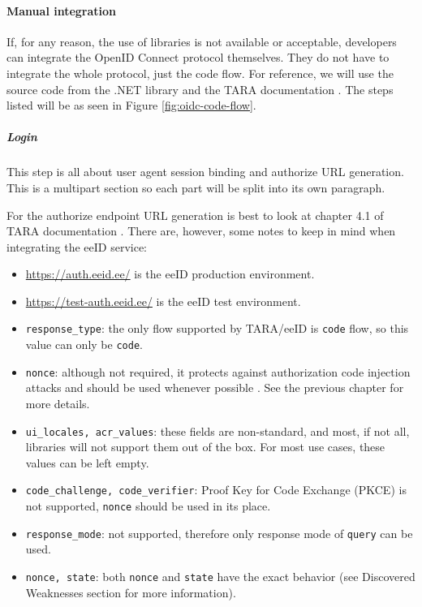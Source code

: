 \paragraph{Manual integration} If, for any reason, the use of libraries is not available or acceptable, developers can integrate the OpenID Connect protocol themselves. They do not have to integrate the whole protocol, just the code flow. For reference, we will use the source code from the {.NET} library \cite{ms-auth-oidc-src} and the TARA documentation \cite{tara-technical}. The steps listed will be as seen in Figure \ref{fig:oidc-code-flow}.

\subparagraph{Login}

This step is all about user agent session binding and {authorize URL} generation. This is a multipart section so each part will be split into its own paragraph.

For the {authorize} endpoint URL generation is best to look at chapter 4.1 of TARA documentation \cite{tara-technical}. There are, however, some notes to keep in mind when integrating the eeID service:

\begin{itemize}
  \item \url{https://auth.eeid.ee/} is the eeID production environment.
  \item \url{https://test-auth.eeid.ee/} is the eeID test environment.
  \item \texttt{response\_type}: the only flow supported by TARA/eeID is \texttt{code} flow, so this value can only be \texttt{code}.
  \item \texttt{nonce}: although not required, it protects against authorization code injection attacks and should be used whenever possible \cite{ietf-oauth-security-topics-19}. See the previous chapter for more details.
  \item \texttt{ui\_locales, acr\_values}: these fields are non-standard, and most, if not all, libraries will not support them out of the box. For most use cases, these values can be left empty.
  \item \texttt{code\_challenge, code\_verifier}: Proof Key for Code Exchange (PKCE) is not supported, \texttt{nonce} should be used in its place.
  \item \texttt{response\_mode}: not supported, therefore only response mode of \texttt{query} can be used.
  \item \texttt{nonce, state}: both \texttt{nonce} and \texttt{state} have the exact behavior (see Discovered Weaknesses section for more information).
\end{itemize}


